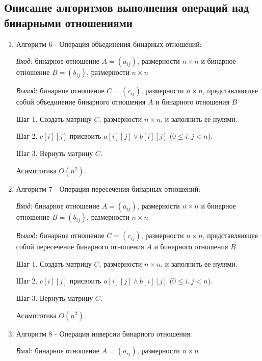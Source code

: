 \documentclass[spec, och, labwork]{shiza}
\begin{document}
\subsection{Описание алгоритмов выполнения операций над бинарными отношениями}
            \begin{enumerate}
                \item Алгоритм 6 - Операция объединения бинарных отношений:
                
                \textit{Вход}: бинарное отношение $A = (a_{ij})$, размерности $n \times n$ и бинарное отношение $B = (b_{ij})$, размерности $n \times n$

                \textit{Выход}: бинарное отношение $C = (c_{ij})$, размерности $n \times n$, представляющее собой объединение бинарного отношения $A$ и
                бинарного отношения $B$

                Шаг 1. Создать матрицу $C$, размерности $n \times n$, и заполнить ее нулями.

                Шаг 2. $c[i][j]$ присвоить $a[i][j] \vee b[i][j] $ ($0 \leq i, j < n$).

                Шаг 3. Вернуть матрицу $C$.

                Асимптотика $O(n^2)$.

                \item Алгоритм 7 - Операция пересечения бинарных отношений:
                
                \textit{Вход}: бинарное отношение $A = (a_{ij})$, размерности $n \times n$ и бинарное отношение $B = (b_{ij})$, размерности $n \times n$

                \textit{Выход}: бинарное отношение $C = (c_{ij})$, размерности $n \times n$, представляющее собой пересечение бинарного отношения $A$ и
                бинарного отношения $B$

                Шаг 1. Создать матрицу $C$, размерности $n \times n$, и заполнить ее нулями.

                Шаг 2.  $c[i][j]$ присвоить $a[i][j] \wedge b[i][j] $ ($0 \leq i, j < n$).

                Шаг 3. Вернуть матрицу $C$.

                Асимптотика $O(n^2)$.

                \item Алгоритм 8 - Операция инверсии бинарного отношения:
                
                \textit{Вход}: бинарное отношение $A = (a_{ij})$, размерности $n \times n$


\end{enumerate}
\end{document}
